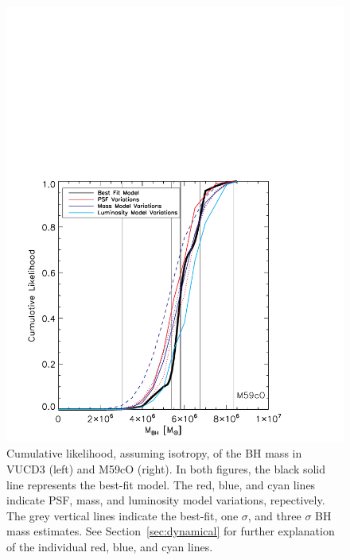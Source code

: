 \documentclass{aastex}
\begin{document}
\begin{figure}[ht!]
\begin{minipage}{0.48\textwidth}
    \includegraphics[trim={0 0 0 10cm},clip,scale=0.5]{m59co_cummulike.pdf}%
  \end{minipage}
    
  \caption{Cumulative likelihood, assuming isotropy, of the BH mass in VUCD3 (left) and M59cO (right). In both figures, the black solid line represents the best-fit model. The red, blue, and cyan lines indicate PSF, mass, and luminosity model variations, repectively. The grey vertical lines indicate the best-fit, one $\sigma$, and three $\sigma$ BH mass estimates. See Section~\ref{sec:dynamical} for further explanation of the individual red, blue, and cyan lines.}
  
  \label{fig:cummulike}
\end{figure}
\end{document}
